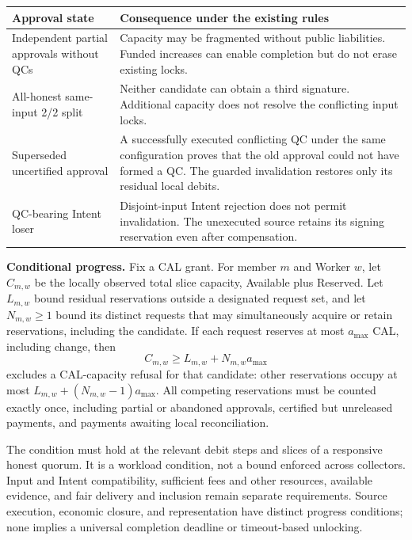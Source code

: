 \par\smallskip
{\small
\setlength{\tabcolsep}{3pt}
\noindent
\begin{tabular}{@{}p{}p{}@{}}
\toprule
Approval state & Consequence under the existing rules \\
\midrule
Independent partial approvals without QCs &
Capacity may be fragmented without public liabilities. Funded increases
can enable completion but do not erase existing locks. \\

All-honest same-input 2/2 split &
Neither candidate can obtain a third signature. Additional capacity
does not resolve the conflicting input locks. \\

Superseded uncertified approval &
A successfully executed conflicting QC under the same configuration
proves that the old approval could not have formed a QC. The guarded
invalidation restores only its residual local debits. \\

QC-bearing Intent loser &
Disjoint-input Intent rejection does not permit invalidation.
The unexecuted source retains its signing reservation even after
compensation. \\
\bottomrule
\end{tabular}
\par}

\noindent\textbf{Conditional progress.}
Fix a CAL grant. For member $m$ and Worker $w$, let $C_{m,w}$ be
the locally observed total slice capacity, Available plus Reserved.
Let $L_{m,w}$ bound residual reservations outside a designated request
set, and let $N_{m,w}\ge1$ bound its distinct requests that may
simultaneously acquire or retain reservations, including the candidate.
If each request reserves at most $a_{\max}$ CAL, including change, then
\[
  C_{m,w}\ge L_{m,w}+N_{m,w}a_{\max}
\]
excludes a CAL-capacity refusal for that candidate: other reservations
occupy at most $L_{m,w}+(N_{m,w}-1)a_{\max}$. All competing reservations
must be counted exactly once, including partial or abandoned approvals,
certified but unreleased payments, and payments awaiting local
reconciliation.

The condition must hold at the relevant debit steps and slices of a
responsive honest quorum. It is a workload condition, not a bound
enforced across collectors. Input and Intent compatibility, sufficient
fees and other resources, available evidence, and fair delivery and
inclusion remain separate requirements. Source execution, economic
closure, and representation have distinct progress conditions; none
implies a universal completion deadline or timeout-based unlocking.

